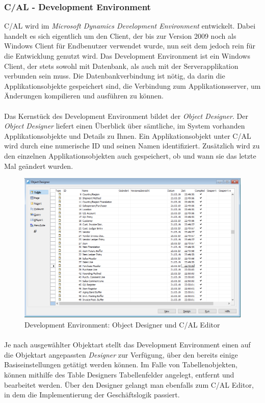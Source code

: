 \subsubsection{C/AL - Development Environment}
C/AL wird im \textit{Microsoft Dynamics Development Environment} entwickelt. Dabei handelt es sich eigentlich um den Client, der bis zur Version 2009 noch als Windows Client für Endbenutzer verwendet wurde, nun seit dem jedoch rein für die Entwicklung genutzt wird. Das Development Environment ist ein Windows Client, der stets sowohl mit Datenbank, als auch mit der Serverapplikation verbunden sein muss. Die Datenbankverbindung ist nötig, da darin die Applikationsobjekte gespeichert sind, die Verbindung zum Applikationsserver, um Änderungen kompilieren und ausführen zu können.

\paragraph{}
Das Kernstück des Development Environment bildet der \textit{Object Designer}. Der \textit{Object Designer} liefert einen Überblick über sämtliche, im System vorhanden Applikationsobjekte und Details zu Ihnen. Ein Applikationsobjekt unter C/AL wird durch eine numerische ID und seinen Namen identifiziert. Zusätzlich wird zu den einzelnen Applikationsobjekten auch gespeichert, ob und wann sie das letzte Mal geändert wurden.

\begin{figure}[h]
	\centering
	\includegraphics[width=130mm]{images/ObjectDesigner}
	\caption{Development Environment: Object Designer und C/AL Editor}
	\label{fig:ObjectDesigner}
\end{figure}

\paragraph{}
Je nach ausgewählter Objektart stellt das Development Environment einen auf die Objektart angepassten \textit{Designer} zur Verfügung, über den bereits einige Basiseinstellungen getätigt werden können. Im Falle von Tabellenobjekten, können mithilfe des Table Designers Tabellenfelder angelegt, entfernt und bearbeitet werden. Über den Designer gelangt man ebenfalls zum C/AL Editor, in dem die Implementierung der Geschäftslogik passiert.

